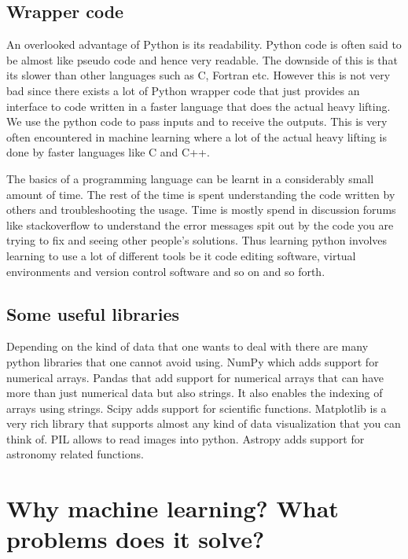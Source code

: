 \documentclass{../template/texnote}
\begin{document}
\subsection{Wrapper code}

An overlooked advantage of Python is its readability. Python code is often said to be almost like pseudo code and hence very readable. The downside of this is that its slower than other languages such as C, Fortran etc. However this is not very bad since there exists a lot of Python wrapper code that just provides an interface to code written in a faster language that does the actual heavy lifting. We use the python code to pass inputs and to receive the outputs. This is very often encountered in machine learning where a lot of the actual heavy lifting is done by faster languages like C and C++. 

The basics of a programming language can be learnt in a considerably small amount of time. The rest of the time is spent understanding the code written by others and troubleshooting the usage. Time is mostly spend in discussion forums like stackoverflow to understand the error messages spit out by the code you are trying to fix and seeing other people’s solutions. Thus learning python involves learning to use a lot of different tools be it code editing software, virtual environments and version control software and so on and so forth.

\subsection{Some useful libraries}

Depending on the kind of data that one wants to deal with there are many python libraries that one cannot avoid using. NumPy which adds support for numerical arrays. Pandas that add support for numerical arrays that can have more than just numerical data but also strings. It also enables the indexing of arrays using strings. Scipy adds support for scientific functions. Matplotlib is a very rich library that supports almost any kind of data visualization that you can think of. PIL allows to read images into python. Astropy adds support for astronomy related functions.

\section{Why machine learning? What problems does it solve?}
\end{document}
